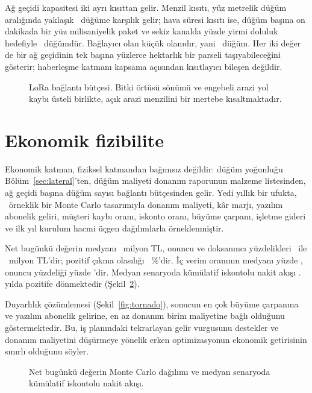 \documentclass[11pt,a4paper]{article}
\begin{document}
Ağ geçidi kapasitesi iki ayrı kısıttan gelir. Menzil kısıtı, yüz metrelik
düğüm aralığında yaklaşık \nodesRange\ düğüme karşılık gelir; hava süresi
kısıtı ise, düğüm başına on dakikada bir yüz milisaniyelik paket ve sekiz
kanalda yüzde yirmi doluluk hedefiyle \nodesAirtime\ düğümdür. Bağlayıcı olan
küçük olanıdır, yani \nodesPerGw\ düğüm. Her iki değer de bir ağ geçidinin tek
başına yüzlerce hektarlık bir parseli taşıyabileceğini gösterir; haberleşme
katmanı kapsama açısından kısıtlayıcı bileşen değildir.

\begin{figure}[htbp]\centering

\caption{LoRa bağlantı bütçesi. Bitki örtüsü sönümü ve engebeli arazi yol
kaybı üsteli birlikte, açık arazi menzilini bir mertebe kısaltmaktadır.}
\label{fig:link}
\end{figure}

\section{Ekonomik fizibilite}

Ekonomik katman, fiziksel katmandan bağımsız değildir: düğüm yoğunluğu
Bölüm~\ref{sec:lateral}'ten, düğüm maliyeti donanım raporunun malzeme
listesinden, ağ geçidi başına düğüm sayısı bağlantı bütçesinden gelir. Yedi
yıllık bir ufukta, \econRuns\ örneklik bir Monte Carlo tasarımıyla donanım
maliyeti, kâr marjı, yazılım abonelik geliri, müşteri kaybı oranı, iskonto
oranı, büyüme çarpanı, işletme gideri ve ilk yıl kurulum hacmi üçgen
dağılımlarla örneklenmiştir.

Net bugünkü değerin medyanı \npvMed\ milyon TL, onuncu ve doksanıncı
yüzdelikleri \npvPten\ ile \npvPninety\ milyon TL'dir; pozitif çıkma olasılığı
\pNpvPos~\%'dir. İç verim oranının medyanı yüzde \irrMed, onuncu yüzdeliği
yüzde \irrPten'dir. Medyan senaryoda kümülatif iskontolu nakit akışı
\paybackYear{}. yılda pozitife dönmektedir (Şekil~\ref{fig:econ}).

Duyarlılık çözümlemesi (Şekil~\ref{fig:tornado}), sonucun en çok büyüme
çarpanına ve yazılım abonelik gelirine, en az donanım birim maliyetine bağlı
olduğunu göstermektedir. Bu, iş planındaki tekrarlayan gelir vurgusunu
destekler ve donanım maliyetini düşürmeye yönelik erken optimizasyonun
ekonomik getirisinin sınırlı olduğunu söyler.

\begin{figure}[htbp]\centering

\caption{Net bugünkü değerin Monte Carlo dağılımı ve medyan senaryoda
kümülatif iskontolu nakit akışı.}
\label{fig:econ}
\end{figure}
\end{document}
